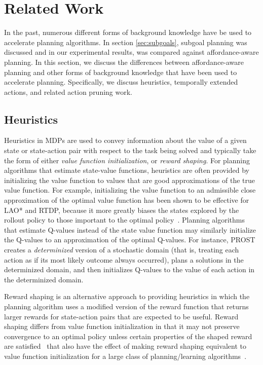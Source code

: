 \documentclass[]{article}
\begin{document}



\section{Related Work}
In the past, numerous different forms of background knowledge have be used to 
accelerate planning algorithms. In section \ref{sec:subgoals}, subgoal
planning was discussed and in our experimental results, was compared against affordance-aware planning. 
In this section, we discuss the differences between affordance-aware planning and other
forms of background knowledge that have been used to accelerate planning.
Specifically, we discuss heuristics, temporally extended actions, and related action pruning work.


\subsection{Heuristics}
Heuristics in MDPs are used to convey information about the value of a given state or state-action pair with respect to the task being solved and typically take the form of either {\em value function initialization},
or {\em reward shaping}. For planning algorithms that estimate state-value functions, heuristics are often
provided by initializing the value function to values that are good approximations of the true value function. For example, initializing the value function to an admissible close approximation of the optimal value function has been shown to be effective for LAO* and RTDP, because it more greatly biases the states explored by the rollout policy to those important to the optimal policy~\cite{Hansen:1999qf}. Planning algorithms that estimate Q-values instead of the state value function may similarly initialize the Q-values to an approximation of the optimal Q-values. For instance, PROST~\cite{keller2012prost} creates a {\em determinized} version of a stochastic domain (that is, treating each action as if its most likely outcome always occurred), plans a solutions in the determinized domain, and then initializes Q-values to the value of each action in the determinized domain.

Reward shaping is an alternative approach to providing heuristics in which the planning algorithm uses a modified version of the reward function that returns larger rewards for state-action pairs that are expected to be useful. Reward shaping differs from value function initialization in that it may not preserve convergence to an optimal policy unless certain properties of the shaped reward are satisfied~\cite{potshap} that also have the effect of making reward shaping equivalent to value function initialization for a large class of planning/learning algorithms~\cite{Wiewiora:2003fk}.
\end{document}
